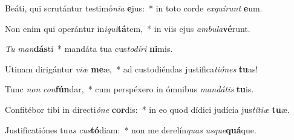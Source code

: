 \item Beáti, qui scrutántur testimó\textit{ni}\textit{a} \textbf{e}jus:~* in toto corde \textit{ex}\textit{quí}\textit{runt} \textbf{e}um.
\item Non enim qui operántur in\textit{i}\textit{qui}\textbf{tá}tem,~* in viis ejus \textit{am}\textit{bu}\textit{la}\textbf{vé}runt.
\item \textit{Tu} \textit{man}\textbf{dás}ti~* mandáta tua cus\textit{to}\textit{dí}\textit{ri} \textbf{ni}mis.
\item Utinam dirigántur \textit{vi}\textit{æ} \textbf{me}æ,~* ad custodiéndas justifica\textit{ti}\textit{ó}\textit{nes} \textbf{tu}as!
\item Tunc \textit{non} \textit{con}\textbf{fún}dar,~* cum perspéxero in ómnibus \textit{man}\textit{dá}\textit{tis} \textbf{tu}is.
\item Confitébor tibi in directi\textit{ó}\textit{ne} \textbf{cor}dis:~* in eo quod dídici judícia jus\textit{tí}\textit{ti}\textit{æ} \textbf{tu}æ.
\item Justificatiónes tu\textit{as} \textit{cus}\textbf{tó}diam:~* non me derelín\textit{quas} \textit{us}\textit{que}\textbf{quá}que.
